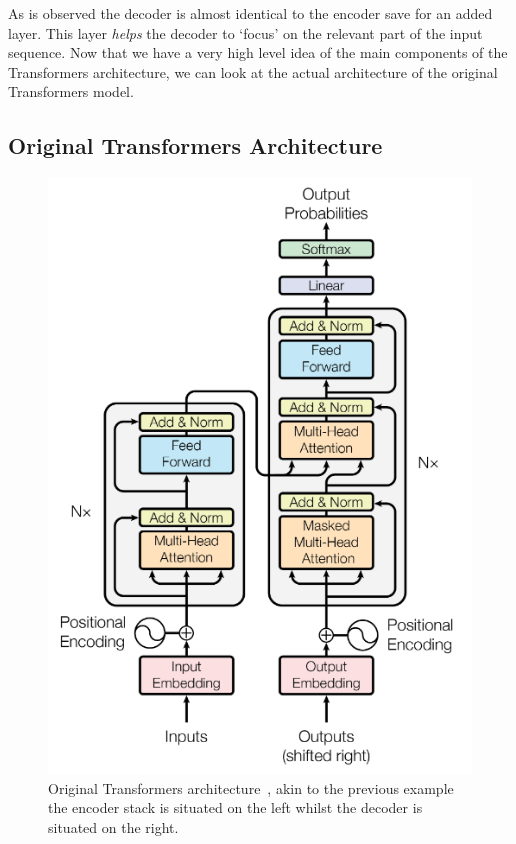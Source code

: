 As is observed the decoder is almost identical to the encoder save for an added  layer. This layer
\emph{helps} the decoder to `focus' on the relevant part of the input sequence.
Now that we have a very high level idea of the main components of the Transformers architecture, we can look at the actual architecture of
the original Transformers model.
\subsection{Original Transformers Architecture}
\begin{figure}[H]
	\centering
	\includegraphics[width=0.55\linewidth]{figures/original_transformer_archi.png}
	\caption{Original Transformers architecture~\autocite{vaswaniAttentionAllYou}, akin to the previous example the encoder stack
		is situated on the left whilst the decoder is situated on the right.}
	\label{fig:transformer_architecture}
\end{figure}
